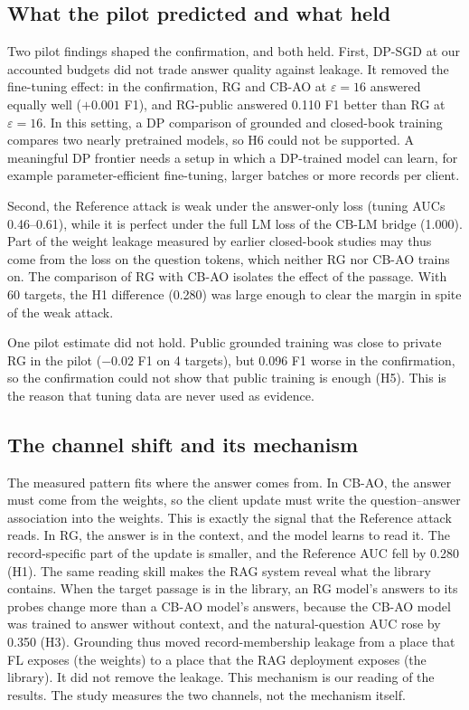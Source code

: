 \documentclass[11pt]{article}
\begin{document}
\subsection{What the pilot predicted and what held}\label{sec:pilot-discussion}

Two pilot findings shaped the confirmation, and both held. First, DP-SGD at our accounted budgets did not trade answer quality against leakage. It removed the fine-tuning effect: in the confirmation, RG and CB-AO at $\varepsilon=16$ answered equally well ($+0.001$ F1), and RG-public answered 0.110 F1 better than RG at $\varepsilon=16$. In this setting, a DP comparison of grounded and closed-book training compares two nearly pretrained models, so H6 could not be supported. A meaningful DP frontier needs a setup in which a DP-trained model can learn, for example parameter-efficient fine-tuning, larger batches or more records per client.

Second, the Reference attack is weak under the answer-only loss (tuning AUCs 0.46--0.61), while it is perfect under the full LM loss of the CB-LM bridge (1.000). Part of the weight leakage measured by earlier closed-book studies may thus come from the loss on the question tokens, which neither RG nor CB-AO trains on. The comparison of RG with CB-AO isolates the effect of the passage. With 60 targets, the H1 difference (0.280) was large enough to clear the margin in spite of the weak attack.

One pilot estimate did not hold. Public grounded training was close to private RG in the pilot ($-0.02$ F1 on 4 targets), but 0.096 F1 worse in the confirmation, so the confirmation could not show that public training is enough (H5). This is the reason that tuning data are never used as evidence.

\subsection{The channel shift and its mechanism}\label{sec:mechanism}

The measured pattern fits where the answer comes from. In CB-AO, the answer must come from the weights, so the client update must write the question--answer association into the weights. This is exactly the signal that the Reference attack reads. In RG, the answer is in the context, and the model learns to read it. The record-specific part of the update is smaller, and the Reference AUC fell by 0.280 (H1). The same reading skill makes the RAG system reveal what the library contains. When the target passage is in the library, an RG model's answers to its probes change more than a CB-AO model's answers, because the CB-AO model was trained to answer without context, and the natural-question AUC rose by 0.350 (H3). Grounding thus moved record-membership leakage from a place that FL exposes (the weights) to a place that the RAG deployment exposes (the library). It did not remove the leakage. This mechanism is our reading of the results. The study measures the two channels, not the mechanism itself.
\end{document}
